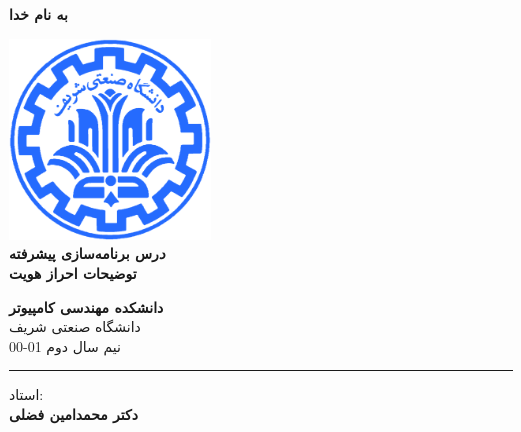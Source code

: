 \documentclass[]{article}
\begin{document}
\begin{titlepage}
\begin{center}

\textbf{ \Huge{به نام خدا} }
        
\vspace{0.2cm}

\includegraphics[width=0.4\textwidth]{sharif1.png}\\
\vspace{0.2cm}
\textbf{ \Huge{\emph درس برنامه‌سازی پیشرفته} }\\
\vspace{0.25cm}
\textbf{ \Large{ توضیحات احراز هویت} }
\vspace{0.2cm}
       
 
      \large \textbf{دانشکده مهندسی کامپیوتر}\\\vspace{0.1cm}
    \large   دانشگاه صنعتی شریف\\\vspace{0.2cm}
       \large   ﻧﯿﻢ سال دوم 01-00 \\\vspace{0.10cm}
      \noindent\rule[1ex]{\linewidth}{1pt}
استاد:\\
    \textbf{{دکتر محمدامین فضلی}}



    \vspace{0.20cm}


    

\end{center}
\end{titlepage}


\newpage
\pagestyle{fancy}
\fancyhf{}
\fancyfoot{}
\cfoot{\thepage}
\renewcommand{\headrulewidth}{2pt}
\end{document}
